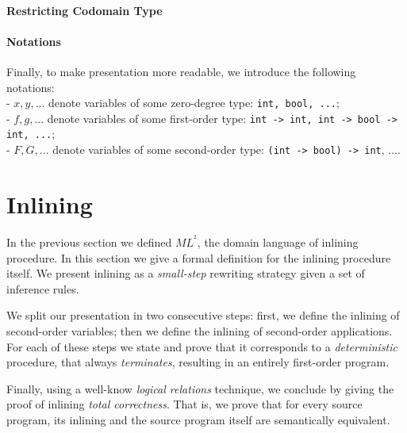 \documentclass[a4paper,11pt,oneside]{article}
\theoremstyle{plain}
\newcommand{\inlsrc}{\textit{ML}^{^2}}
\begin{document}
\paragraph{Restricting Codomain Type}
\paragraph{Notations}
Finally, to make presentation more readable, we introduce the following notations:\\
 \hspace*{0.5cm} - $x,y,...$ denote variables of some zero-degree type: \texttt{int, bool, ...};\\
 \hspace*{0.5cm} - $f,g,...$ denote variables of some first-order type: \texttt{int -> int, int -> bool -> int, ...};\\ 
 \hspace*{0.5cm} - $F,G,...$ denote variables of some second-order type: \texttt{(int -> bool) -> int}, ....


\newpage
\section{Inlining}

 In the previous section we defined $\inlsrc$, the domain language of inlining procedure. 
 In this section we give a formal definition for the inlining procedure itself.
 We present inlining as a \textit{small-step} rewriting strategy given a set of inference rules.
 
 We split our presentation in two consecutive steps: first, we define the inlining of second-order variables; then we define the inlining of second-order applications.
 For each of these steps we state and prove that it corresponds to a \textit{deterministic} procedure, that always \textit{terminates}, resulting in an entirely first-order program.
 
	Finally, using a well-know \textit{logical relations} technique, we conclude by giving the proof of inlining \textit{total correctness}. 
	That is, we prove that for every source program, its inlining and the source program itself are semantically equivalent.\\
\end{document}
